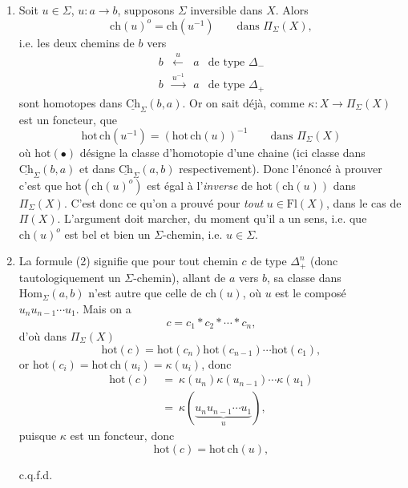 \documentclass[11pt]{article}
\newcommand{\printedpage}[1]{\marginpar{\footnotesize p.~#1}}
\newcommand{\msp}[1]{\marginpar{\vspace*{10pt}\footnotesize [#1]}}
\newcommand{\Ch}{\underline{\mathrm{Ch}}}
\newcommand{\Fl}{\mathrm{Fl}}
\newcommand{\Hom}{\mathrm{Hom}}
\newcommand{\ch}{\mathrm{ch}}
\newcommand{\hot}{\mathrm{hot}}
\begin{document}
\begin{enumerate}[label={}]
\item[$1^o$)] Soit $u \in \Sigma$, $u : a \longrightarrow b$, supposons $\Sigma$ inversible dans $X$. Alors
\[
\ch(u)^o = \ch(u^{-1}) \qquad \text{dans } \Pi_\Sigma(X),
\]
i.e. les deux chemins de $b$ vers
\[
\begin{array}{cccl}
b & \xleftarrow{\ u\ } & a & \text{de type } \Delta_- \\
b & \xrightarrow{u^{-1}} & a & \text{de type } \Delta_+
\end{array}
\]
\printedpage{47}
sont homotopes dans $\Ch_\Sigma(b,a)$. Or on sait déjà, comme $\kappa : X \longrightarrow \Pi_\Sigma(X)$ est un foncteur, que
\[
\hot\,\ch(u^{-1}) = (\hot\,\ch(u))^{-1} \qquad \text{dans } \Pi_\Sigma(X)
\]
où $\hot(\bullet)$ désigne la classe d'homotopie d'une chaine (ici classe dans $\Ch_\Sigma(b,a)$ et dans $\Ch_\Sigma(a,b)$ respectivement). Donc l'énoncé à prouver c'est que $\hot(\ch(u)^o)$ est égal à l'\textit{inverse} de $\hot(\ch(u))$ dans $\Pi_\Sigma(X)$. C'est donc ce qu'on a prouvé pour \textit{tout} $u \in \Fl(X)$, dans le cas de $\Pi(X)$. L'argument doit marcher, du moment qu'il a un sens, i.e. que $\ch(u)^o$ est bel et bien un $\Sigma$-chemin, i.e. $u \in \Sigma$.

\item[$2^o$)] La formule (2) signifie que pour tout chemin $c$ de type $\Delta_+^n$ (donc tautologiquement un \msp{page 71} $\Sigma$-chemin), allant de $a$ vers $b$, sa classe dans $\Hom_\Sigma(a,b)$ n'est autre que celle de $\ch(u)$, où $u$ est le composé $u_nu_{n-1}\cdots u_1$. Mais on a
\[
c = c_1 * c_2 * \cdots * c_n,
\]
d'où dans $\Pi_\Sigma(X)$
\[
\hot(c) = \hot(c_n)\hot(c_{n-1})\cdots\hot(c_1),
\]
or $\hot(c_i) = \hot\,\ch(u_i) = \kappa(u_i)$, donc
\[
\begin{aligned}
\hot(c) \ &= \ \kappa(u_n)\kappa(u_{n-1})\cdots\kappa(u_1) \\
&= \ \kappa(\underbrace{u_nu_{n-1}\cdots u_1}_{u}),
\end{aligned}
\]
puisque $\kappa$ est un foncteur, donc
\[
\hot(c) = \hot\,\ch(u),
\]

\hfill c.q.f.d.
\end{enumerate}
\end{document}
